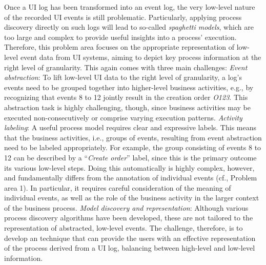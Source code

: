 Once a UI log has been transformed into an event log, the very low-level nature of the recorded UI events is still problematic. Particularly, applying process discovery directly on such logs will lead to so-called \emph{spaghetti models}, which are too large and complex to provide useful insights into a process' execution.
Therefore, this problem area focuses on the appropriate representation of low-level event data from UI systems, aiming to depict key process information at the right level of granularity. This again comes with three main challenges: 
\vspace{0.2em}
\newline%
\noindent\textit{Event abstraction}: To lift low-level UI data to the right level of granularity, a log's events need to be grouped together into higher-level business activities, e.g., by recognizing that events 8 to 12 jointly result in the creation order \emph{O123}. This abstraction task is highly challenging, though, since business activities may be executed non-consecutively or comprise varying execution patterns.
\vspace{0.2em}
\newline%
\noindent \textit{Activity labeling}: A useful process model requires clear and expressive labels. 
This means that the business activities, i.e., groups of events,  resulting from event abstraction need to be labeled appropriately. For example, the group consisting of events 8 to 12 can be described by a ``\textit{Create order}'' label, since this is the primary outcome its various low-level steps. Doing this automatically is highly complex, however, and fundamentally differs from the annotation of individual events (cf., Problem area 1). In particular, it requires careful consideration of the meaning of individual events, as well as the role of the business activity in the larger context of the business process.
 \vspace{0.2em}
 \newline%
\noindent \textit{Model discovery and representation}: 
Although various process discovery algorithms have been developed, these are not tailored to the representation of abstracted, low-level events. 
The challenge, therefore, is to develop an technique that can provide the users with an effective representation of the process derived from a UI log, balancing between high-level and low-level information.
%


